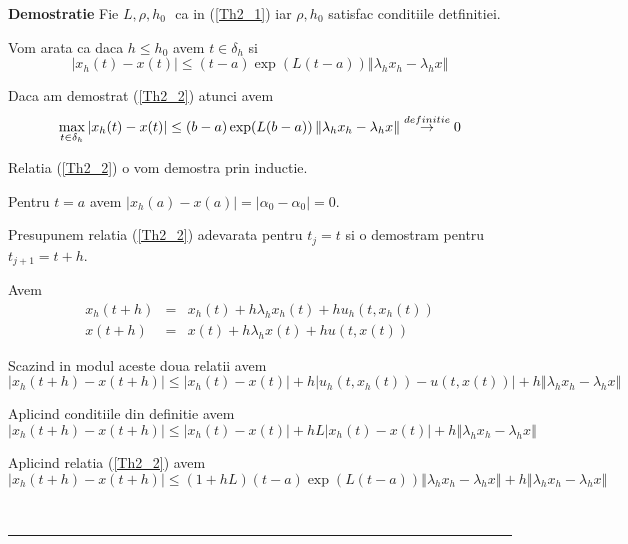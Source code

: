 \documentclass[a4paper,twoside]{book}
\newenvironment{proof}[1][Proof]{\noindent\textbf{Demostratie} }{\ \rule{0.5em}{0.5em}}
\begin{document}
\begin{proof}
Fie $L,\rho ,h_{0}\,$\ ca in (\ref{Th2_1}) iar $\rho ,h_{0}$ satisfac
conditiile detfinitiei.

Vom arata ca daca $h\leq h_{0}$ avem $t\in \delta _{h}$ si%
\begin{equation}
\left\vert x_{h}(t)-x(t)\right\vert \leq (t-a)\exp (L(t-a))\left\Vert
\lambda _{h}x_{h}-\lambda _{h}x\right\Vert  \label{Th2_2}
\end{equation}

Daca am demostrat (\ref{Th2_2}) atunci avem%
\begin{equation*}
\max_{t\in \delta _{h}}\left\vert x_{h}(t)-x(t)\right\vert \leq (b-a)\exp
(L(b-a))\left\Vert \lambda _{h}x_{h}-\lambda _{h}x\right\Vert \overset{%
definitie}{\rightarrow }0
\end{equation*}

Relatia (\ref{Th2_2}) o vom demostra prin inductie.

Pentru $t=a$ avem $\left\vert x_{h}(a)-x(a)\right\vert =\left\vert \alpha
_{0}-\alpha _{0}\right\vert =0$.

Presupunem relatia (\ref{Th2_2}) adevarata pentru $t_{j}=t$ si o demostram
pentru $t_{j+1}=t+h$.

Avem%
\begin{eqnarray*}
x_{h}(t+h) &=&x_{h}(t)+h\lambda _{h}x_{h}(t)+hu_{h}(t,x_{h}(t)) \\
x(t+h) &=&x(t)+h\lambda _{h}x(t)+hu(t,x(t))
\end{eqnarray*}

Scazind in modul aceste doua relatii avem%
\begin{equation*}
\left\vert x_{h}(t+h)-x(t+h)\right\vert \leq \left\vert
x_{h}(t)-x(t)\right\vert +h\left\vert u_{h}(t,x_{h}(t))-u(t,x(t))\right\vert
+h\left\Vert \lambda _{h}x_{h}-\lambda _{h}x\right\Vert
\end{equation*}

Aplicind conditiile din definitie avem%
\begin{equation*}
\left\vert x_{h}(t+h)-x(t+h)\right\vert \leq \left\vert
x_{h}(t)-x(t)\right\vert +hL\left\vert x_{h}(t)-x(t)\right\vert +h\left\Vert
\lambda _{h}x_{h}-\lambda _{h}x\right\Vert
\end{equation*}

Aplicind relatia (\ref{Th2_2}) avem%
\begin{equation*}
\left\vert x_{h}(t+h)-x(t+h)\right\vert \leq (1+hL)(t-a)\exp
(L(t-a))\left\Vert \lambda _{h}x_{h}-\lambda _{h}x\right\Vert +h\left\Vert
\lambda _{h}x_{h}-\lambda _{h}x\right\Vert
\end{equation*}


\end{proof}
\end{document}

